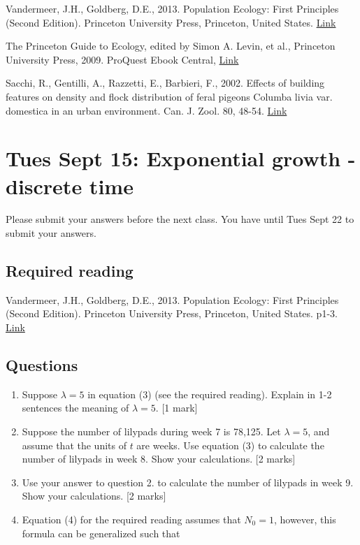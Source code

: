 \documentclass[]{book}
\begin{document}
Vandermeer, J.H., Goldberg, D.E., 2013. Population Ecology: First
Principles (Second Edition). Princeton University Press, Princeton,
United States.
\href{https://ebookcentral-proquest-com.qe2a-proxy.mun.ca/lib/mun/detail.action?docID=1205619}{Link}

The Princeton Guide to Ecology, edited by Simon A. Levin, et al.,
Princeton University Press, 2009. ProQuest Ebook Central,
\href{https://ebookcentral-proquest-com.qe2a-proxy.mun.ca/lib/mun/detail.action?docID=557123}{Link}

Sacchi, R., Gentilli, A., Razzetti, E., Barbieri, F., 2002. Effects of
building features on density and flock distribution of feral pigeons
Columba livia var. domestica in an urban environment. Can. J. Zool. 80,
48-54. \href{https://doi.org/10.1139/z01-202}{Link}

\chapter{Tues Sept 15: Exponential growth - discrete
time}\label{tues-sept-15-exponential-growth---discrete-time}

Please submit your answers before the next class. You have until Tues
Sept 22 to submit your answers.

\section{Required reading}\label{required-reading}

Vandermeer, J.H., Goldberg, D.E., 2013. Population Ecology: First
Principles (Second Edition). Princeton University Press, Princeton,
United States. p1-3.
\href{https://ebookcentral-proquest-com.qe2a-proxy.mun.ca/lib/mun/detail.action?docID=1205619}{Link}

\section{Questions}\label{questions-1}

\begin{enumerate}
\def\labelenumi{\arabic{enumi}.}
\item
  Suppose \(\lambda = 5\) in equation (3) (see the required reading).
  Explain in 1-2 sentences the meaning of \(\lambda = 5\). {[}1 mark{]}
\item
  Suppose the number of lilypads during week 7 is 78,125. Let
  \(\lambda = 5\), and assume that the units of \(t\) are weeks. Use
  equation (3) to calculate the number of lilypads in week 8. Show your
  calculations. {[}2 marks{]}
\item
  Use your answer to question 2. to calculate the number of lilypads in
  week 9. Show your calculations. {[}2 marks{]}
\item
  Equation (4) for the required reading assumes that \(N_0=1\), however,
  this formula can be generalized such that
\end{enumerate}
\end{document}
